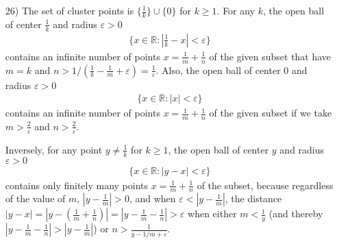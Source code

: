 \documentclass[a4paper,12pt]{article}
\begin{document}
\begin{enumerate}
        \item[26)]
            The set of cluster points is $\{\frac{1}{k}\} \cup \{0\}$ for $k \geq 1$. For any $k$, the open ball of center $\frac{1}{k}$ and radius $\varepsilon > 0$
            \begin{align*}
                \{ x \in \mathbb{R} : \left| \frac{1}{k} - x \right| < \varepsilon \}
            \end{align*}
            contains an infinite number of points $x = \frac{1}{m} + \frac{1}{n}$ of the given subset that have $m = k$ and $n > 1 / (\frac{1}{k} - \frac{1}{m} + \varepsilon) = \frac{1}{\varepsilon}$. Also, the open ball of center $0$ and radius $\varepsilon > 0$
            \begin{align*}
                \{ x \in \mathbb{R} : |x| < \varepsilon \}
            \end{align*}
            contains an infinite number of points $x = \frac{1}{m} + \frac{1}{n}$ of the given subset if we take $m > \frac{2}{\varepsilon}$ and $n > \frac{2}{\varepsilon}$. \par
            Inversely, for any point $y \neq \frac{1}{k}$ for $k \geq 1$, the open ball of center $y$ and radius $\varepsilon > 0$
            \begin{align*}
                \{ x \in \mathbb{R} : \left| y - x \right| < \varepsilon \}
            \end{align*}
            contains only finitely many points $x = \frac{1}{m} + \frac{1}{n}$ of the subset, because regardless of the value of $m$, $|y - \frac{1}{m}| > 0$, and when $\varepsilon < \left| y - \frac{1}{m} \right| $, the distance $|y - x| = \left| y - (\frac{1}{m} + \frac{1}{n}) \right| = \left| y - \frac{1}{m} - \frac{1}{n} \right| > \varepsilon$ when either $m < \frac{1}{y}$ (and thereby $\left| y - \frac{1}{m} - \frac{1}{n} \right| > \left| y - \frac{1}{m} \right|$) or $n > \frac{1}{y - 1/m + \varepsilon}$.


\end{enumerate}
\end{document}
